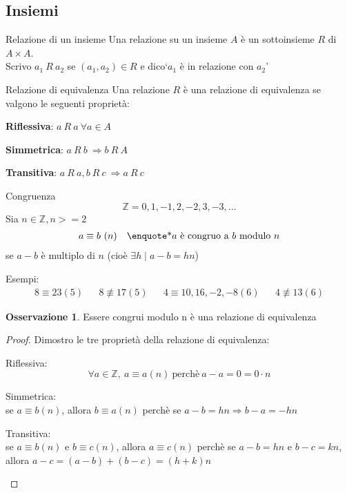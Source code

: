 \documentclass[a4paper]{article}
\theoremstyle{definition}
\newtheorem*{oss}{Osservazione}
\begin{document}
\subsection{Insiemi}
\begin{deff}{Relazione di un insieme}{}
	Una relazione su un insieme \(A\) è un sottoinsieme \(R\) di \(A \times A\). \\
	Scrivo \(a_1 \ R \ a_2\) se \( (a_1, a_2) \in R\) e dico\enquote*{\(a_1\) è in relazione con \(a_2\)}
\end{deff}
\begin{deff}{Relazione di equivalenza}{}
	Una relazione \(R\) è una relazione di equivalenza se valgono le seguenti proprietà:
	\begin{description}
		\item \textbf{Riflessiva}: \(a \ R \ a \ \forall a \in A \)
		\item \textbf{Simmetrica}: \(a \ R \ b \ \Rightarrow b \ R \ A \)
		\item \textbf{Transitiva}: \(a \ R \ a, b \ R \ c \ \Rightarrow a \ R \ c \)
	\end{description}
\end{deff}
\begin{deff}{Congruenza}{}
	\[ \mathbb{Z} = {0, 1, -1, 2, -2, 3, -3, ...} \]
	Sia $n \in \mathbb{Z}, n >= 2$
	\begin{align*}
		a \equiv b \ (n) &  & \text{\enquote*{$a$ è congruo a $b$ modulo $n$}}
	\end{align*}
	se $a - b$ è multiplo di $n$ (cioè $\exists h \mid a - b = hn$)
\end{deff}
Esempi:
\begin{align*}
	8 \equiv 23 (5) &  & 8 \not\equiv 17(5) &  & 4 \equiv 10,16,-2,-8(6) &  & 4 \not\equiv 13(6)
\end{align*}
\begin{oss}
	Essere congrui modulo n è una relazione di equivalenza
\end{oss}
\begin{proof}
	Dimostro le tre proprietà della relazione di equivalenza:
	\begin{description}
		\item Riflessiva: \[ \forall a \in \mathbb{Z}, \ a \equiv a (n) \ \text{perchè} \ a - a = 0 = 0 \cdot n\]
		\item Simmetrica: \\ se $a \equiv b (n)$, allora $b \equiv a (n)$ perchè se $a - b = hn \Rightarrow b - a = -hn$
		\item Transitiva: \\ se $a \equiv b (n)$ e $b \equiv c (n)$, allora $a \equiv c (n)$ perchè se $a - b = hn$ e $b - c = kn$, allora $a - c = (a - b) + (b - c) = (h + k)n$
	\end{description}
\end{proof}
\end{document}
